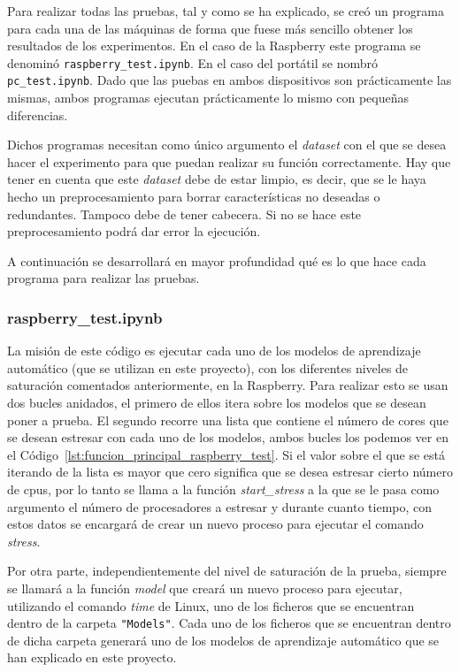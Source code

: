 \documentclass[a4paper, 12pt]{book}
\begin{document}
Para realizar todas las pruebas, tal y como se ha explicado, se creó un programa para cada una de las máquinas de forma que fuese más sencillo obtener los resultados de los experimentos. En el caso de la Raspberry este programa se denominó \texttt{raspberry\_test.ipynb}. En el caso del portátil se nombró \texttt{pc\_test.ipynb}. Dado que las puebas en ambos dispositivos son prácticamente las mismas, ambos programas ejecutan prácticamente lo mismo con pequeñas diferencias.

Dichos programas necesitan como único argumento el \textit{dataset} con el que se desea hacer el experimento para que puedan realizar su función correctamente.
Hay que tener en cuenta que este \textit{dataset} debe de estar limpio, es decir, que se le haya hecho un preprocesamiento para borrar características no deseadas o redundantes. Tampoco debe de tener cabecera. Si no se hace este preprocesamiento podrá dar error la ejecución.

A continuación se desarrollará en mayor profundidad qué es lo que hace cada programa para realizar las pruebas.


\subsubsection{raspberry\_test.ipynb}
\label{subsubsec:programa_pruebas_raspberry}

La misión de este código es ejecutar cada uno de los modelos de aprendizaje automático (que se utilizan en este proyecto), con los diferentes niveles de saturación comentados anteriormente, en la Raspberry. Para realizar esto se usan dos bucles anidados, el primero de ellos itera sobre los modelos que se desean poner a prueba. El segundo recorre una lista que contiene el número de cores que se desean estresar con cada uno de los modelos, ambos bucles los podemos ver en el Código~\ref{lst:funcion_principal_raspberry_test}. Si el valor sobre el que se está iterando de la lista es mayor que cero significa que se desea estresar cierto número de cpus, por lo tanto se llama a la función \textit{start\_stress} a la que se le pasa como argumento el número de procesadores a estresar y durante cuanto tiempo, con estos datos se encargará de crear un nuevo proceso para ejecutar el comando \textit{stress}.

Por otra parte, independientemente del nivel de saturación de la prueba, siempre se llamará a la función \textit{model} que creará un nuevo proceso para ejecutar, utilizando el comando \textit{time} de Linux, uno de los ficheros que se encuentran dentro de la carpeta \texttt{"Models"}. Cada uno de los ficheros que se encuentran dentro de dicha carpeta generará uno de los modelos de aprendizaje automático que se han explicado en este proyecto. 
\end{document}
